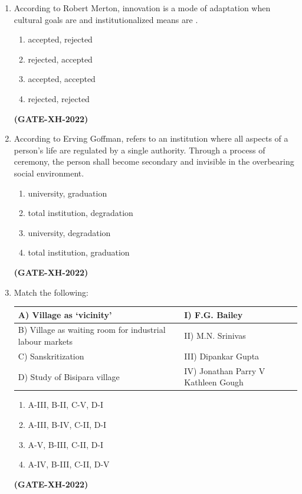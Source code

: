 \documentclass[journal]{IEEEtran}
\begin{document}
\begin{enumerate}
\item
According to Robert Merton, innovation is a mode of adaptation when cultural goals are \underline{\hspace{1cm}} and institutionalized means are \underline{\hspace{1cm}}.
\begin{multicols}{2}
\begin{enumerate}
\item accepted, rejected
\item rejected, accepted
\item accepted, accepted
\item rejected, rejected
\end{enumerate}
\end{multicols}
\hfill\textbf{(GATE-XH-2022)}

\item
According to Erving Goffman, \underline{\hspace{1cm}} refers to an institution where all aspects of a person’s life are regulated by a single authority. Through a process of \underline{\hspace{1cm}} ceremony, the person shall become secondary and invisible in the overbearing social environment.
\begin{multicols}{2}
\begin{enumerate}
\item university, graduation
\item total institution, degradation
\item university, degradation
\item total institution, graduation
\end{enumerate}
\end{multicols}
\hfill\textbf{(GATE-XH-2022)}

\item
Match the following:\\
\begin{tabular}{|p{5cm}|p{6cm}|}
\hline
A) Village as ‘vicinity’ & I) F.G. Bailey\\
\hline
B) Village as waiting room for industrial
labour markets &II) M.N. Srinivas\\
\hline
C) Sanskritization &III) Dipankar Gupta\\
\hline
D) Study of Bisipara village &IV) Jonathan Parry V Kathleen Gough\\
\hline
\end{tabular}
\begin{enumerate}
\item A-III, B-II, C-V, D-I
\item A-III, B-IV, C-II, D-I
\item A-V, B-III, C-II, D-I
\item A-IV, B-III, C-II, D-V
\end{enumerate}
\hfill\textbf{(GATE-XH-2022)}


\end{enumerate}
\end{document}
